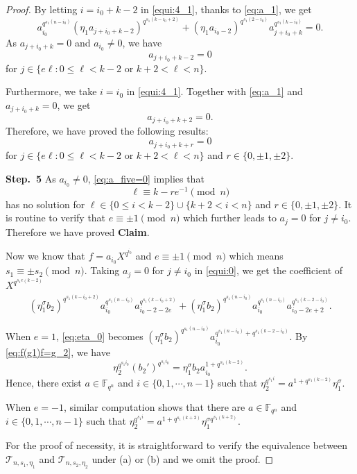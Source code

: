 \documentclass{amsart}
\theoremstyle{plain}
\theoremstyle{definition}
\newcommand{\fqn}{\mathbb{F}_{q^n}}
\newcommand{\cT}{\mathcal{T}}
\begin{document}
\begin{proof}
		By letting $i = i_0+k-2$ in \eqref{equi:4_1}, thanks to \eqref{eq:a_1}, we get
		\[
		a_{i_0}^{q^{s_1(n-i_0)}} (\eta_1a_{j + i_0+k-2})^{q^{s_1(k-i_0+2)}} 
		+(\eta_1a_{i_0-2})^{q^{s_1(2-i_0)}} a_{j + i_0+k}^{q^{s_1(k - i_0)}}=0.
		\]
		As $a_{j+i_0+k}=0$ and $a_{i_0}\neq 0$, we have
		\begin{equation*}
			a_{j+i_0+k-2}=0
		\end{equation*}
		for  $j\in\{e\ell: 0\leq \ell < k-2\text{ or  }k+2< \ell <n\}$.
		
		Furthermore, we take $i=i_0$ in \eqref{equi:4_1}. Together with \eqref{eq:a_1} and $a_{j+i_0+k}=0$, we get
		\[
		a_{j+i_0+k+2}=0.
		\]
		Therefore, we have proved the following results:
		\begin{equation}\label{eq:a_five=0}
			a_{j+i_0+k+r}=0
		\end{equation}
		for  $j\in\{e\ell: 0\leq \ell < k-2\text{ or  }k+2< \ell <n\}$ and $r\in \{0,\pm 1, \pm 2\}$.
		
		\textbf{Step.\ 5} As $a_{i_0}\neq 0$, \eqref{eq:a_five=0} implies that
		\[\ell\equiv k-re^{-1}\pmod{n}\]
		has no solution for $\ell\in\{0\leq i < k-2\}\cup\{k+2< i <n\}$ and $r\in\{0,\pm 1,\pm 2\}$. 
		It is routine to verify that $e\equiv \pm 1 \pmod{n}$ which further leads to $a_j=0$ for $j\neq i_0$. Therefore we have proved \textbf{Claim}.
		
		Now we know that $f=a_{i_0}X^{q^{i_0}}$ and $e\equiv \pm 1\pmod{n}$ which means $s_1\equiv \pm s_2\pmod{n}$.
		Taking $a_j=0$ for $j\neq i_0$ in \eqref{equi:0}, 
		we get the coefficient of $X^{q^{s_1e{(k-2)}}}$
		\begin{align}\label{eq:eta_0}
			(\eta_1^\sigma b_2)^{q^{s_1(k - i_0 +2)}} a_{i_0}^{q^{s_1(n - i_0)}} a_{i_0 -2-2e}^{q^{s_1(k - i_0+2)}} + 	(\eta_1^\sigma b_2)^{q^{s_1(n - i_0)}} a_{i_0}^{q^{s_1(n - i_0)}} a_{  i_0 -2e+2}^{q^{s_1(k-2 - i_0)}}.
		\end{align}
		
		When $e=1$, \eqref{eq:eta_0} becomes \((\eta_1^\sigma b_2)^{q^{s_1(n - i_0)}} a_{i_0}^{q^{s_1(n - i_0)}+q^{s_1(k-2 - i_0)}}\). By \eqref{eq:f(g1)f=g_2}, we have 
		\[
		\eta_2^{q^{s_1i_0}} (b_2')^{q^{s_1 i_0}} = \eta_1^\sigma b_2 a_{i_0}^{1+q^{s_1(k-2)}}.
		\]
		Hence, there exist $a\in\fqn$ and $i\in\{0,1,\cdots,n-1\}$ such that  $\eta_2^{q^{s_1i}}=a^{1+q^{s_1(k-2)}}\eta_1^\sigma$.
		
		When $e=-1$, similar computation shows that  there are $a\in\fqn$ and $i\in\{0,1,\cdots,n-1\}$ such that  $\eta_2^{q^{s_1i}}=a^{1+q^{s_1(k+2)}}\eta_1^{\sigma q^{s_1(k+2)}}$.
		
		For the proof of necessity, it is straightforward to verify the equivalence between $\cT_{n,s_1, \eta_1}$ and $\cT_{n,s_2, \eta_2}$ under (a) or (b) and we omit the proof.
	\end{proof}
	
\end{document}
